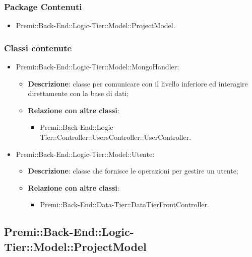 	\subsubsection*{Package Contenuti}
		\begin{itemize}
			\item Premi::Back-End::Logic-Tier::Model::ProjectModel.
		\end{itemize}
	
	\subsubsection*{Classi contenute}
	\begin{itemize}
		\item Premi::Back-End::Logic-Tier::Model::MongoHandler:
		\begin{itemize}
			\item \textbf{Descrizione}: classe per comunicare con il livello inferiore ed interagire direttamente con la base di dati;
			\item \textbf{Relazione con altre classi}:
			\begin{itemize}
				\item Premi::Back-End::Logic-Tier::Controller::UsersController::UserController.
			\end{itemize}
		\end{itemize}
			
		\item Premi::Back-End::Logic-Tier::Model::Utente:
		\begin{itemize}
			\item \textbf{Descrizione}: classe che fornisce le operazioni per gestire un utente;
			\item \textbf{Relazione con altre classi}:
			\begin{itemize}
				\item Premi::Back-End::Data-Tier::DataTierFrontController.
			\end{itemize}
		\end{itemize}
	\end{itemize}


\subsection{Premi::Back-End::Logic-Tier::Model::ProjectModel}
